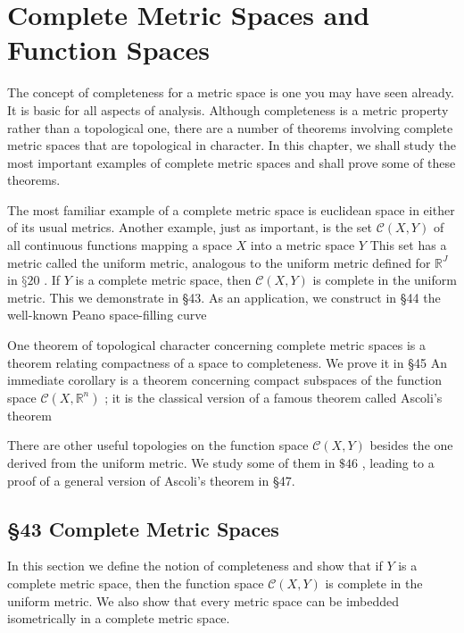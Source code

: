 \chapter{Complete Metric Spaces and Function Spaces}

The concept of completeness for a metric space is one you may have seen already. It is basic for all aspects of analysis. Although completeness is a metric property rather than a topological one, there are a number of theorems involving complete metric spaces that are topological in character. In this chapter, we shall study the most important examples of complete metric spaces and shall prove some of these theorems.

The most familiar example of a complete metric space is euclidean space in either of its usual metrics. Another example, just as important, is the set \(\mathcal{C}\left( {X,Y}\right)\) of all continuous functions mapping a space \(X\) into a metric space \(Y\) This set has a metric called the uniform metric, analogous to the uniform metric defined for \({\mathbb{R}}^{J}\) in \(§{20}\) . If \(Y\) is a complete metric space, then \(\mathcal{C}\left( {X,Y}\right)\) is complete in the uniform metric. This we demonstrate in §43. As an application, we construct in §44 the well-known Peano space-filling curve

One theorem of topological character concerning complete metric spaces is a theorem relating compactness of a space to completeness. We prove it in §45 An immediate corollary is a theorem concerning compact subspaces of the function space \(\mathcal{C}\left( {X,{\mathbb{R}}^{n}}\right)\) ; it is the classical version of a famous theorem called Ascoli’s theorem

There are other useful topologies on the function space \(\mathcal{C}\left( {X,Y}\right)\) besides the one derived from the uniform metric. We study some of them in \(\$ {46}\) , leading to a proof of a general version of Ascoli’s theorem in §47.

\section*{§43 Complete Metric Spaces}

In this section we define the notion of completeness and show that if \(Y\) is a complete metric space, then the function space \(\mathcal{C}\left( {X,Y}\right)\) is complete in the uniform metric. We also show that every metric space can be imbedded isometrically in a complete metric space.

